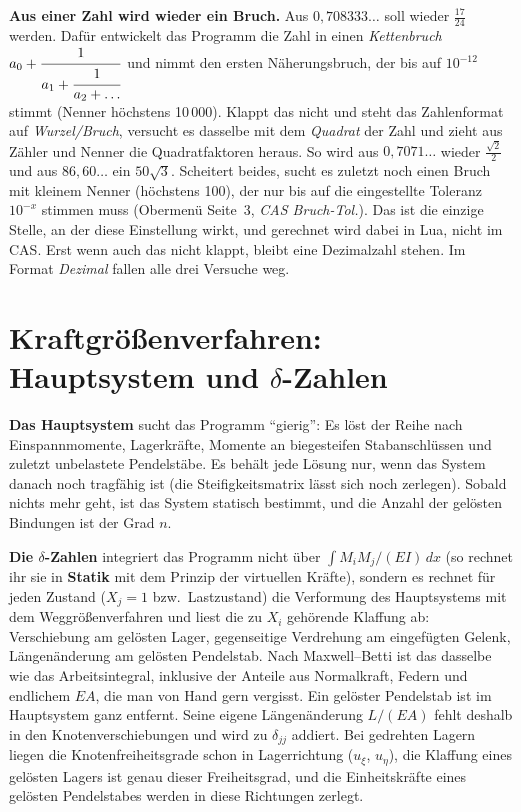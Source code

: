 \textbf{Aus einer Zahl wird wieder ein Bruch.} Aus $0{,}708333\ldots$ soll wieder
$\frac{17}{24}$ werden. Dafür entwickelt das Programm die Zahl in einen \emph{Kettenbruch}
$a_0 + \cfrac{1}{a_1 + \cfrac{1}{a_2 + \dots}}$ und nimmt den ersten Näherungsbruch, der bis
auf $10^{-12}$ stimmt (Nenner höchstens 10\,000). Klappt das nicht und steht das Zahlenformat auf
\emph{Wurzel/Bruch}, versucht es dasselbe mit dem \emph{Quadrat} der Zahl und zieht aus Zähler und
Nenner die Quadratfaktoren heraus. So wird aus $0{,}7071\ldots$ wieder $\frac{\sqrt 2}{2}$ und
aus $86{,}60\ldots$ ein $50\sqrt 3$. Scheitert beides, sucht es zuletzt noch einen Bruch mit
kleinem Nenner (höchstens 100), der nur bis auf die eingestellte Toleranz $10^{-x}$ stimmen muss
(Obermenü Seite~3, \emph{CAS Bruch-Tol.}). Das ist die einzige Stelle, an der diese Einstellung
wirkt, und gerechnet wird dabei in Lua, nicht im CAS. Erst wenn auch das nicht klappt, bleibt eine
Dezimalzahl stehen. Im Format \emph{Dezimal} fallen alle drei Versuche weg.

\section{Kraftgrößenverfahren: Hauptsystem und \texorpdfstring{$\delta$}{delta}-Zahlen}\label{sec:mathe-kgv}

\textbf{Das Hauptsystem} sucht das Programm \enquote{gierig}: Es löst der Reihe nach
Einspannmomente, Lagerkräfte, Momente an biegesteifen Stabanschlüssen und zuletzt unbelastete
Pendelstäbe. Es behält jede Lösung nur, wenn das System danach noch tragfähig ist (die
Steifigkeitsmatrix lässt sich noch zerlegen). Sobald nichts mehr geht, ist das System statisch
bestimmt, und die Anzahl der gelösten Bindungen ist der Grad $n$.

\textbf{Die $\delta$-Zahlen} integriert das Programm nicht über $\int M_i M_j/(EI)\,dx$ (so rechnet
ihr sie in \textbf{Statik} mit dem Prinzip der virtuellen Kräfte), sondern es
rechnet für jeden Zustand ($X_j = 1$ bzw.\ Lastzustand) die Verformung des Hauptsystems mit dem
Weggrößenverfahren und liest die zu $X_i$ gehörende Klaffung ab: Verschiebung am gelösten Lager,
gegenseitige Verdrehung am eingefügten Gelenk, Längenänderung am gelösten Pendelstab. Nach
Maxwell--Betti ist das dasselbe wie das Arbeitsintegral, inklusive der Anteile aus Normalkraft,
Federn und endlichem $EA$, die man von Hand gern vergisst. Ein gelöster Pendelstab ist im
Hauptsystem ganz entfernt. Seine eigene Längenänderung $L/(EA)$ fehlt deshalb in den
Knotenverschiebungen und wird zu $\delta_{jj}$ addiert. Bei gedrehten Lagern liegen die
Knotenfreiheitsgrade schon in Lagerrichtung ($u_\xi$, $u_\eta$), die Klaffung eines gelösten Lagers
ist genau dieser Freiheitsgrad, und die Einheitskräfte eines gelösten Pendelstabes werden in
diese Richtungen zerlegt.

